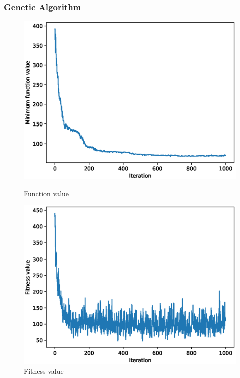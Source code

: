 \documentclass{article}
\begin{document}
\subsubsection{Genetic Algorithm}
\begin{figure}[!htbp]
	\centering
	\begin{minipage}{.48\textwidth}
		\centering
		\includegraphics[scale=.4]{experiment_1a_rastrigin/min_eval_0.eps}
		\caption{Function value}
	\end{minipage}\hfill
	\begin{minipage}{.48\textwidth}
		\centering
		\includegraphics[scale=.4]{experiment_1a_rastrigin/max_fitness_0.eps}
		\caption{Fitness value}
	\end{minipage}
\end{figure}
\FloatBarrier
\end{document}
